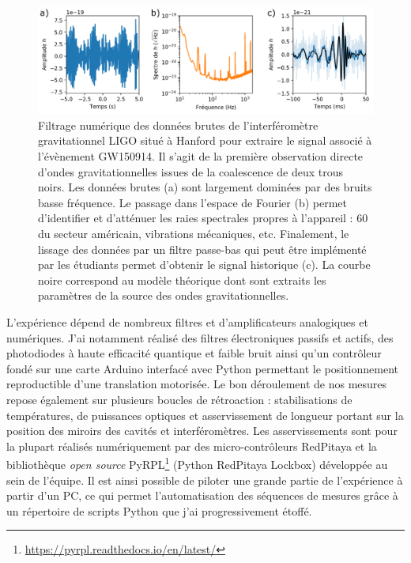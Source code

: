 \documentclass[12pt,a4paper]{article}
\begin{document}
\begin{figure}
\center
\includegraphics[scale=0.75]{figures/GW150914_data_abc_small.png}
\caption{Filtrage numérique des données brutes de l'interféromètre gravitationnel LIGO situé à Hanford pour extraire le signal associé à l'évènement GW150914.
Il s'agit de la première observation directe d'ondes gravitationnelles issues de la coalescence de deux trous noirs.
Les données brutes (a) sont largement dominées par des bruits basse fréquence.
Le passage dans l'espace de Fourier (b) permet d'identifier et d'atténuer les raies spectrales propres à l'appareil : \unit{60}{\hertz} du secteur américain, vibrations mécaniques, etc.
Finalement, le lissage des données par un filtre passe-bas qui peut être implémenté par les étudiants permet d'obtenir le signal historique (c).
La courbe noire correspond au modèle théorique dont sont extraits les paramètres de la source des ondes gravitationnelles.}
\label{fig:GW150914}
\end{figure}

L'expérience dépend de nombreux filtres et d'amplificateurs analogiques et numériques.
J'ai notamment réalisé des filtres électroniques passifs et actifs, des photodiodes à haute efficacité quantique et faible bruit ainsi qu'un contrôleur fondé sur une carte Arduino interfacé avec Python permettant le positionnement reproductible d'une translation motorisée.
Le bon déroulement de nos mesures repose également sur plusieurs boucles de rétroaction : stabilisations de températures, de puissances optiques et asservissement de longueur portant sur la position des miroirs des cavités et interféromètres.
Les asservissements sont pour la plupart réalisés numériquement par des micro-contrôleurs RedPitaya et la bibliothèque \textit{open source} PyRPL\footnote{\url{https://pyrpl.readthedocs.io/en/latest/}} (Python RedPitaya Lockbox) développée au sein de l'équipe.
Il est ainsi possible de piloter une grande partie de l'expérience à partir d'un PC, ce qui permet l'automatisation des séquences de mesures grâce à un répertoire de scripts Python que j'ai progressivement étoffé.
\end{document}
